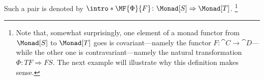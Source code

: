 Such a pair is denoted by $\intro*\MF{\Phi}{F}\colon \Monad[S] \Rightarrow \Monad[T]$.%
\footnote{Note that, somewhat surprisingly, one element of a monad functor
from $\Monad[S]$ to $\Monad[T]$ goes is covariant---namely the functor
$F\colon \cat{C} \to \cat{D}$---while the other one is contravariant---namely
the natural transformation $\Phi\colon TF \Rightarrow FS$. The next example will
illustrate why this definition makes sense.}

